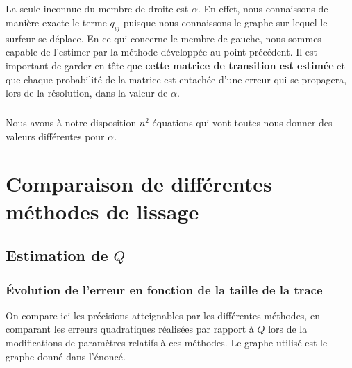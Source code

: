 \documentclass[a4paper,titlepage]{report}
\begin{document}
\paragraph{}
La seule inconnue du membre de droite est $\alpha$. En effet, nous connaissons de manière exacte le terme $q_{ij}$ puisque nous connaissons le graphe sur lequel le surfeur se déplace. En ce qui concerne le membre de gauche, nous sommes capable de l'estimer par la méthode développée au point précédent. Il est important de garder en tête que \textbf{cette matrice de transition est estimée} et que chaque probabilité de la matrice est entachée d'une erreur qui se propagera, lors de la résolution, dans la valeur de $\alpha$. 
\paragraph{}
Nous avons à notre disposition $n^2$ équations qui vont toutes nous donner des valeurs différentes pour $\alpha$. 

\appendix

\chapter{Comparaison de différentes méthodes de lissage}

\section{Estimation de $Q$}
	\subsection{Évolution de l'erreur en fonction de la taille de la trace}

On compare ici les précisions atteignables par les différentes méthodes, en comparant les erreurs quadratiques réalisées par rapport à $Q$ lors de la modifications de paramètres relatifs à ces méthodes. Le graphe utilisé est le graphe donné dans l'énoncé.
\end{document}
